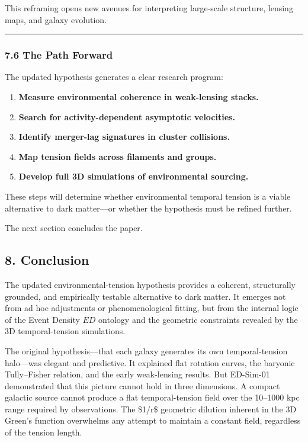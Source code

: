 This reframing opens new avenues for interpreting large-scale structure,
lensing maps, and galaxy evolution.

\begin{center}\rule{0.5\linewidth}{0.5pt}\end{center}

\subsubsection{7.6 The Path Forward}\label{the-path-forward}

The updated hypothesis generates a clear research program:

\begin{enumerate}
\def\labelenumi{\arabic{enumi}.}
\tightlist
\item
  \textbf{Measure environmental coherence in weak-lensing stacks.}\\
\item
  \textbf{Search for activity-dependent asymptotic velocities.}\\
\item
  \textbf{Identify merger-lag signatures in cluster collisions.}\\
\item
  \textbf{Map tension fields across filaments and groups.}\\
\item
  \textbf{Develop full 3D simulations of environmental sourcing.}
\end{enumerate}

These steps will determine whether environmental temporal tension is a
viable alternative to dark matter---or whether the hypothesis must be
refined further.

The next section concludes the paper.

\subsection{8. Conclusion}\label{conclusion}

The updated environmental-tension hypothesis provides a coherent,
structurally grounded, and empirically testable alternative to dark
matter. It emerges not from ad hoc adjustments or phenomenological
fitting, but from the internal logic of the Event Density \(ED\)
ontology and the geometric constraints revealed by the 3D
temporal-tension simulations.

The original hypothesis---that each galaxy generates its own
temporal-tension halo---was elegant and predictive. It explained flat
rotation curves, the baryonic Tully--Fisher relation, and the early
weak-lensing results. But ED-Sim-01 demonstrated that this picture
cannot hold in three dimensions. A compact galactic source cannot
produce a flat temporal-tension field over the 10--1000 kpc range
required by observations. The \$1/r\$ geometric dilution inherent in the
3D Green's function overwhelms any attempt to maintain a constant field,
regardless of the tension length.

